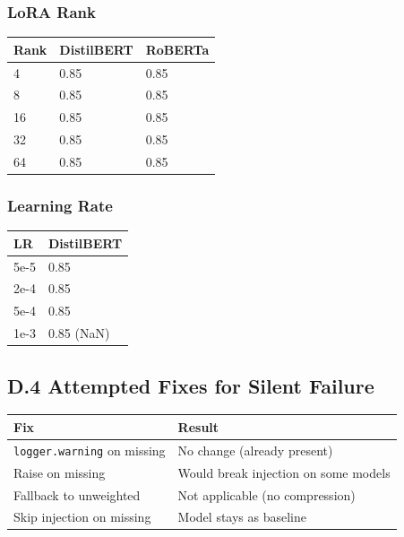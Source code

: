 \subsubsection{LoRA Rank}

\begin{table}[H]
\centering
\small
\begin{tabular}{lll}
\toprule
\textbf{Rank} & \textbf{DistilBERT} & \textbf{RoBERTa} \\
\midrule
4 & 0.85 & 0.85 \\
8 & 0.85 & 0.85 \\
16 & 0.85 & 0.85 \\
32 & 0.85 & 0.85 \\
64 & 0.85 & 0.85 \\
\bottomrule
\end{tabular}
\end{table}

\subsubsection{Learning Rate}

\begin{table}[H]
\centering
\small
\begin{tabular}{ll}
\toprule
\textbf{LR} & \textbf{DistilBERT} \\
\midrule
5e-5 & 0.85 \\
2e-4 & 0.85 \\
5e-4 & 0.85 \\
1e-3 & 0.85 (NaN) \\
\bottomrule
\end{tabular}
\end{table}

\subsection{D.4 Attempted Fixes for Silent Failure}

\begin{table}[H]
\centering
\small
\begin{tabular}{ll}
\toprule
\textbf{Fix} & \textbf{Result} \\
\midrule
\texttt{logger.warning} on missing & No change (already present) \\
Raise on missing & Would break injection on some models \\
Fallback to unweighted & Not applicable (no compression) \\
Skip injection on missing & Model stays as baseline \\
\bottomrule
\end{tabular}
\end{table}

